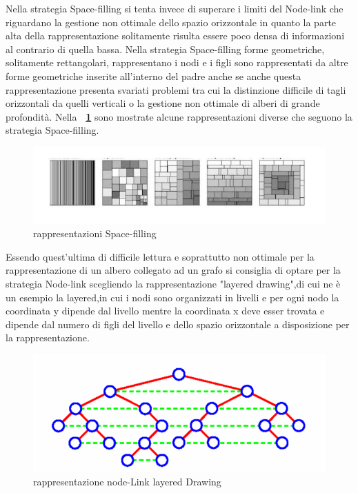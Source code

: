 {Nella strategia Space-filling si tenta invece di superare i limiti del Node-link che riguardano la gestione non ottimale dello spazio orizzontale in quanto la parte alta della rappresentazione solitamente risulta essere poco densa di informazioni al contrario di quella bassa. Nella strategia Space-filling forme geometriche, solitamente rettangolari, rappresentano i nodi e i figli sono rappresentati da altre forme geometriche inserite all'interno del padre anche se anche questa rappresentazione presenta svariati problemi tra cui la distinzione difficile di tagli orizzontali da quelli verticali o la gestione non ottimale di alberi di grande profondità. Nella \textbf{\figurename~\ref{fig:spaceFilling}} sono mostrate alcune rappresentazioni diverse che seguono la strategia Space-filling.
\begin{figure}[!htb]
	\begin{center}
		\includegraphics[width=0.9 \linewidth]{figure/spaceFilling}
	\end{center}
	\caption{rappresentazioni Space-filling\label{fig:spaceFilling}}
\end{figure}
\newline
Essendo quest'ultima di difficile lettura e soprattutto non ottimale per la rappresentazione di un albero collegato ad un grafo si consiglia di optare per la strategia Node-link scegliendo la rappresentazione "layered drawing",di cui ne è un esempio la \figurename{layered},in cui i nodi sono organizzati in livelli e per ogni nodo la coordinata y dipende dal livello mentre la coordinata x deve esser trovata e dipende dal numero di figli del livello e dello spazio orizzontale a disposizione per la rappresentazione.

\begin{figure}[!htb]
	\begin{center}
		\includegraphics[width=0.9 \linewidth]{figure/layered}
	\end{center}
	\caption{rappresentazione node-Link layered Drawing\label{fig:layered}}
\end{figure}
}
